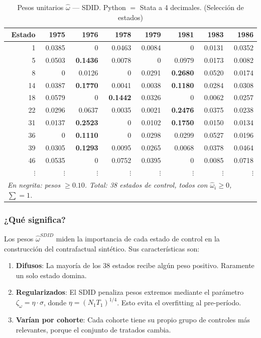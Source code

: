 \documentclass[11pt, a4paper]{article}
\begin{document}
\begin{table}[H]
\centering
\caption{Pesos unitarios $\hat{\omega}$ --- SDID. Python $=$ Stata a 4 decimales. (Selección de estados)}
\small
\begin{tabular}{rrrrrrrr}
\toprule
Estado & 1975 & 1976 & 1978 & 1979 & 1981 & 1983 & 1986 \\
\midrule
1  & 0.0385 & 0      & 0.0463 & 0.0084 & 0      & 0.0131 & 0.0352 \\
5  & 0.0503 & \textbf{0.1436} & 0.0078 & 0      & 0.0979 & 0.0173 & 0.0082 \\
8  & 0      & 0.0126 & 0      & 0.0291 & \textbf{0.2680} & 0.0520 & 0.0174 \\
14 & 0.0387 & \textbf{0.1770} & 0.0041 & 0.0038 & \textbf{0.1180} & 0.0284 & 0.0308 \\
18 & 0.0579 & 0      & \textbf{0.1442} & 0.0326 & 0      & 0.0062 & 0.0257 \\
22 & 0.0296 & 0.0637 & 0.0035 & 0.0021 & \textbf{0.2476} & 0.0375 & 0.0238 \\
31 & 0.0137 & \textbf{0.2523} & 0      & 0.0102 & \textbf{0.1750} & 0.0150 & 0.0134 \\
36 & 0      & \textbf{0.1110} & 0      & 0.0298 & 0.0299 & 0.0527 & 0.0196 \\
39 & 0.0305 & \textbf{0.1293} & 0.0095 & 0.0265 & 0.0068 & 0.0378 & 0.0464 \\
46 & 0.0535 & 0      & 0.0752 & 0.0395 & 0      & 0.0085 & 0.0718 \\
$\vdots$ & $\vdots$ & $\vdots$ & $\vdots$ & $\vdots$ & $\vdots$ & $\vdots$ & $\vdots$ \\
\midrule
\multicolumn{8}{l}{\textit{En negrita: pesos $\geq 0.10$. Total: 38 estados de control, todos con $\hat{\omega}_i\geq 0$, $\sum=1$.}} \\
\bottomrule
\end{tabular}
\end{table}

\subsubsection*{¿Qué significa?}

Los pesos $\hat{\omega}^{SDID}$ miden la importancia de cada estado de control
en la construcción del contrafactual sintético. Sus características son:

\begin{enumerate}
  \item \textbf{Difusos}: La mayoría de los 38 estados recibe algún peso positivo.
    Raramente un solo estado domina.
  \item \textbf{Regularizados}: El SDID penaliza pesos extremos mediante el parámetro
    $\zeta_\omega = \eta \cdot \hat{\sigma}$, donde $\eta = (N_1 T_1)^{1/4}$.
    Esto evita el overfitting al pre-período.
  \item \textbf{Varían por cohorte}: Cada cohorte tiene su propio grupo de controles
    más relevantes, porque el conjunto de tratados cambia.
\end{enumerate}
\end{document}
